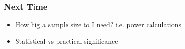 \documentclass[slides]{beamer}
\begin{document}
\begin{frame}[fragile]
\frametitle{Next Time}

\begin{itemize}
\item How big a sample size to I need? i.e. power calculations
\item Statistical vs practical significance
\end{itemize}

\end{frame}
\end{document}

